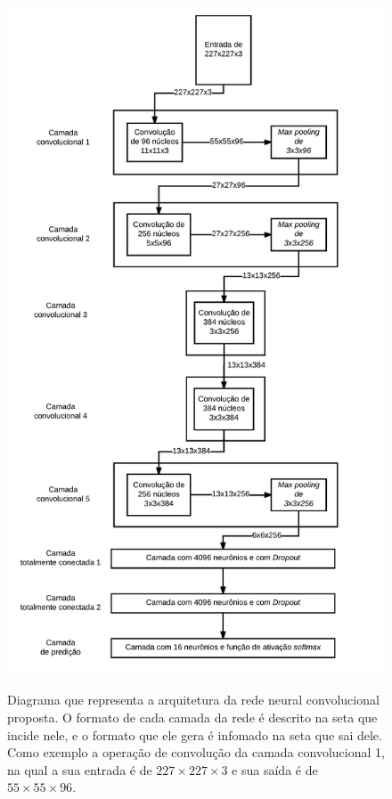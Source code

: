 \begin{figure}[H]
  \centering
  \caption{Diagrama que representa a arquitetura da rede neural convolucional proposta. O formato de cada camada da rede é descrito na seta que incide nele, e o formato que ele gera é infomado na seta que sai dele. Como exemplo a operação de convolução da camada convolucional 1, na qual a sua entrada é de $227\times227\times3$ e sua saída é de $55\times55\times96$.}
  \includegraphics[width=350pt]{dados/figuras/dia_rede}
  \label{fig:arqrede}
\end{figure}


